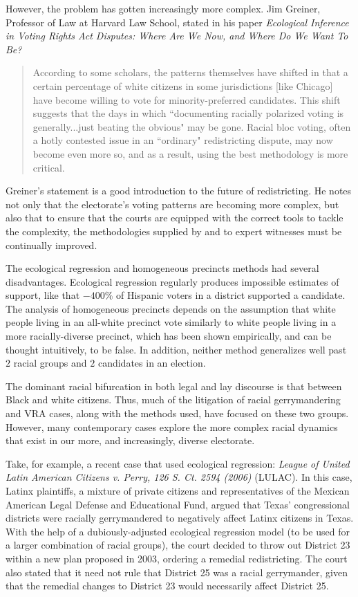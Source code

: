 However, the problem has gotten increasingly more complex. Jim Greiner, Professor of Law at Harvard Law School, stated in his paper \textit{Ecological Inference in Voting Rights Act Disputes: Where Are We Now, and Where Do We Want To Be?}\cite{greiner}

\begin{quote}
 According to some scholars, the patterns themselves have shifted in that a certain percentage of white citizens in some jurisdictions [like Chicago] have become willing to vote for minority-preferred candidates. This shift suggests that the days in which ``documenting racially polarized voting is generally...just beating the obvious" may be gone. Racial bloc voting, often a hotly contested issue in an ``ordinary" redistricting dispute, may now become even more so, and as a result, using the best methodology is more critical.\cite{greiner}
\end{quote}

Greiner's statement is a good introduction to the future of redistricting. He notes not only that the electorate's voting patterns are becoming more complex, but also that to ensure that the courts are equipped with the correct tools to tackle the complexity, the methodologies supplied by and to expert witnesses must be continually improved.

The ecological regression and homogeneous precincts methods had several disadvantages. Ecological regression regularly produces impossible estimates of support, like that $-400\%$ of Hispanic voters in a district supported a candidate. The analysis of homogeneous precincts depends on the assumption that white people living in an all-white precinct vote similarly to white people living in a more racially-diverse precinct, which has been shown empirically, and can be thought intuitively, to be false.\cite{greiner} In addition, neither method generalizes well past $2$ racial groups and $2$ candidates in an election.

The dominant racial bifurcation in both legal and lay discourse is that between Black and white citizens. Thus, much of the litigation of racial gerrymandering and VRA cases, along with the methods used, have focused on these two groups. However, many contemporary cases explore the more complex racial dynamics that exist in our more, and increasingly, diverse electorate.

Take, for example, a recent case that used ecological regression: \textit{League of United Latin American Citizens v. Perry, 126 S. Ct. 2594 (2006)} (LULAC). In this case, Latinx plaintiffs, a mixture of private citizens and representatives of the Mexican American Legal Defense and Educational Fund, argued that Texas' congressional districts were racially gerrymandered to negatively affect Latinx citizens in Texas. With the help of a dubiously-adjusted ecological regression model (to be used for a larger combination of racial groups), the court decided to throw out District 23 within a new plan proposed in 2003, ordering a remedial redistricting.\cite{LULAC} The court also stated that it need not rule that District 25 was a racial gerrymander, given that the remedial changes to District 23 would necessarily affect District 25.

